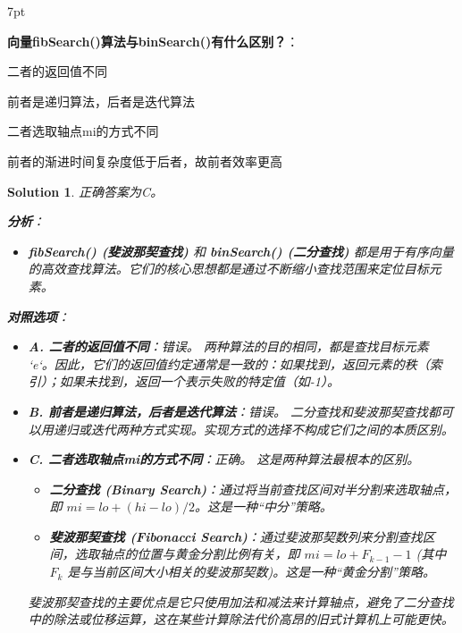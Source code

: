 \documentclass[UTF8]{report}
\newtheorem{solution}{Solution}
\theoremstyle{MyLineTheoremStyle} %
\theoremstyle{MyBlockTheoremStyle} %
\theoremstyle{MySubsubsectionStyle} %
\newenvironment{graybox}{%
        \def\FrameCommand{%
        \hspace{1pt}%
        {\color{gray}\small \vrule width 2pt}%
        {\color{graybox_color}\vrule width 4pt}%
        \colorbox{graybox_color}%
        }%
        \MakeFramed{\advance\hsize-\width\FrameRestore}%
        \noindent\hspace{-4.55pt}%
        \begin{adjustwidth}{}{7pt}%
        \vspace{2pt}\vspace{2pt}%
        }
        {%
        \vspace{2pt}\end{adjustwidth}\endMakeFramed%
        }
\begin{document}
\begin{graybox}
\textbf{向量fibSearch()算法与binSearch()有什么区别？}：
\begin{circledenum}
    \item 二者的返回值不同
    \item 前者是递归算法，后者是迭代算法
    \item 二者选取轴点mi的方式不同
    \item 前者的渐进时间复杂度低于后者，故前者效率更高
\end{circledenum}
\end{graybox}

\begin{solution}
正确答案为C。

\textbf{分析}：
\begin{itemize}
    \item \textbf{fibSearch() (斐波那契查找)} 和 \textbf{binSearch() (二分查找)} 都是用于有序向量的高效查找算法。它们的核心思想都是通过不断缩小查找范围来定位目标元素。
\end{itemize}

\textbf{对照选项}：
\begin{itemize}
    \item \textbf{A. 二者的返回值不同}：错误。
    两种算法的目的相同，都是查找目标元素 `e`。因此，它们的返回值约定通常是一致的：如果找到，返回元素的秩（索引）；如果未找到，返回一个表示失败的特定值（如-1）。

    \item \textbf{B. 前者是递归算法，后者是迭代算法}：错误。
    二分查找和斐波那契查找都可以用递归或迭代两种方式实现。实现方式的选择不构成它们之间的本质区别。

    \item \textbf{C. 二者选取轴点mi的方式不同}：正确。
    这是两种算法最根本的区别。
    \begin{itemize}
        \item \textbf{二分查找 (Binary Search)}：通过将当前查找区间对半分割来选取轴点，即 $mi = lo + (hi - lo) / 2$。这是一种“中分”策略。
        \item \textbf{斐波那契查找 (Fibonacci Search)}：通过斐波那契数列来分割查找区间，选取轴点的位置与黄金分割比例有关，即 $mi = lo + F_{k-1} - 1$ (其中 $F_k$ 是与当前区间大小相关的斐波那契数)。这是一种“黄金分割”策略。
    \end{itemize}
    斐波那契查找的主要优点是它只使用加法和减法来计算轴点，避免了二分查找中的除法或位移运算，这在某些计算除法代价高昂的旧式计算机上可能更快。


\end{itemize}
\end{solution}
\end{document}
